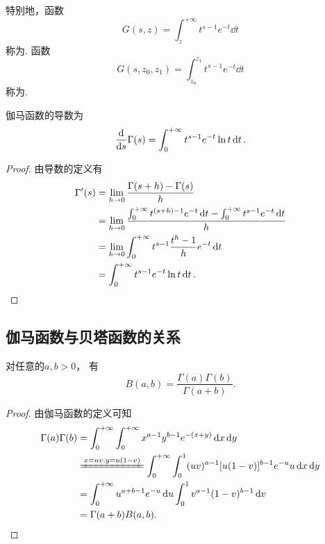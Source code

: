 特别地，函数\[
	G(s,z) = \int_z^{+\infty} t^{s-1} e^{-t} \dd{t}
\]
称为.
函数\[
	G(s,z_0,z_1) = \int_{z_0}^{z_1} t^{s-1} e^{-t} \dd{t}
\]
称为.

\begin{proposition}
伽马函数的导数为\begin{equation}
	\dv{s} \Gamma(s)
	= \int_0^{+\infty} t^{s-1} e^{-t} \ln t \dd{t}.
\end{equation}
\begin{proof}
由导数的定义有\begin{align*}
	\Gamma'(s)
	&= \lim_{h\to0} \frac{\Gamma(s+h)-\Gamma(s)}{h} \\
	&= \lim_{h\to0} \frac{
			\int_0^{+\infty} t^{(s+h)-1} e^{-t} \dd{t}
			- \int_0^{+\infty} t^{s-1} e^{-t} \dd{t}
		}{h} \\
	&= \lim_{h\to0}
		\int_0^{+\infty} t^{s-1} \frac{t^h - 1}{h} e^{-t} \dd{t} \\
	&= \int_0^{+\infty} t^{s-1} e^{-t} \ln t \dd{t}.
	\qedhere
\end{align*}
\end{proof}
\end{proposition}

\subsection{伽马函数与贝塔函数的关系}
\begin{theorem}
对任意的\(a,b>0\)，
有\begin{equation}\label{equation:定积分.伽马函数与贝塔函数的关系}
	B(a,b) = \frac{\Gamma(a) \Gamma(b)}{\Gamma(a+b)}.
\end{equation}
\begin{proof}
由伽马函数的定义可知\begin{align*}
	\Gamma(a) \Gamma(b)
	&= \int_0^{+\infty} \int_0^{+\infty} x^{a-1} y^{b-1} e^{-(x+y)} \dd{x}\dd{y} \\
	&\xlongequal{x=uv,y=u(1-v)}
	\int_0^{+\infty} \int_0^1 (uv)^{a-1} [u(1-v)]^{b-1} e^{-u} u \dd{x}\dd{y} \\
	&=\int_0^{+\infty} u^{a+b-1} e^{-u} \dd{u}
		\int_0^1 v^{a-1} (1-v)^{b-1} \dd{v} \\
	&= \Gamma(a+b) B(a,b).
	\qedhere
\end{align*}
\end{proof}
\end{theorem}

